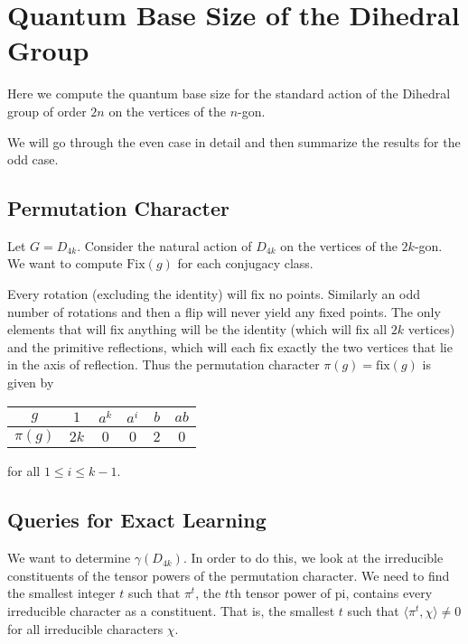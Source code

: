 \section{Quantum Base Size of the Dihedral Group}

Here we compute the quantum base size for the standard action of the Dihedral group of order $2n$ on the vertices 
of the $n$-gon.


We will go through the even case in detail and then summarize the results for the odd case.




\subsection{Permutation Character}



Let $G = D_{4k}$. Consider the natural action of $D_{4k}$ on the vertices of the $2k$-gon. We want to compute 
$\text{Fix}(g)$ for each conjugacy class.


Every rotation (excluding the identity) will fix no points. Similarly an odd number of rotations and then a flip 
will never yield any fixed points.  The only elements that will fix anything will be the identity (which will fix 
all $2k$ vertices) and the primitive reflections, which will each fix exactly the two vertices that lie in the axis 
of reflection. Thus the permutation character $\pi(g) = \text{fix}(g)$ is given by
\begin{center}
\begin{tabular}{c|ccccc}
    $g$ &$1$ & $a^k$ & $a^i$ & $b$ & $ab$ \\ \hline
    $\pi(g)$ & $2k$ & $0$ & $0$ & $2$ & $0$ \\
\end{tabular}
\end{center}
for all $1 \leq i \leq k-1$.

\subsection{Queries for Exact Learning}

We want to determine $\gamma(D_{4k})$. In order to do this, we look at the irreducible constituents of the tensor 
powers of the permutation character. We need to find the smallest integer $t$ such that $\pi^t$, the $t$th tensor 
power of pi, contains every irreducible character as a constituent. That is, the smallest $t$ such that $\langle 
\pi^t, \chi \rangle \neq 0$ for all irreducible characters $\chi$.


